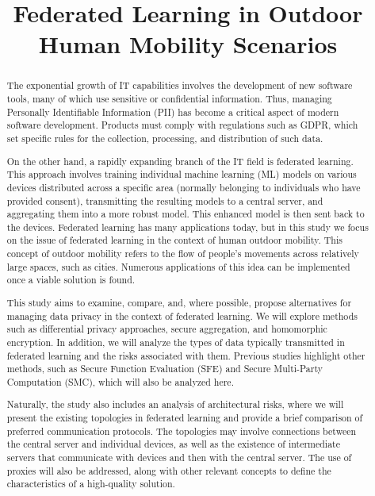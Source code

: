 \documentclass[conference]{IEEEtran}
\begin{document}
\title{Federated Learning in Outdoor Human Mobility Scenarios\\
}

\author{
}

\maketitle

\begin{abstract}
The exponential growth of IT capabilities involves the development of new software tools, many of which use sensitive or confidential information. Thus, managing Personally Identifiable Information (PII) has become a critical aspect of modern software development. Products must comply with regulations such as GDPR, which set specific rules for the collection, processing, and distribution of such data.

On the other hand, a rapidly expanding branch of the IT field is federated learning. This approach involves training individual machine learning (ML) models on various devices distributed across a specific area (normally belonging to individuals who have provided consent), transmitting the resulting models to a central server, and aggregating them into a more robust model. This enhanced model is then sent back to the devices. Federated learning has many applications today, but in this study we focus on the issue of federated learning in the context of human outdoor mobility. This concept of outdoor mobility refers to the flow of people's movements across relatively large spaces, such as cities. Numerous applications of this idea can be implemented once a viable solution is found.

This study aims to examine, compare, and, where possible, propose alternatives for managing data privacy in the context of federated learning. We will explore methods such as differential privacy approaches, secure aggregation, and homomorphic encryption. In addition, we will analyze the types of data typically transmitted in federated learning and the risks associated with them. Previous studies highlight other methods, such as Secure Function Evaluation (SFE) and Secure Multi-Party Computation (SMC), which will also be analyzed here.

Naturally, the study also includes an analysis of architectural risks, where we will present the existing topologies in federated learning and provide a brief comparison of preferred communication protocols. The topologies may involve connections between the central server and individual devices, as well as the existence of intermediate servers that communicate with devices and then with the central server. The use of proxies will also be addressed, along with other relevant concepts to define the characteristics of a high-quality solution.
\end{abstract}
\end{document}
